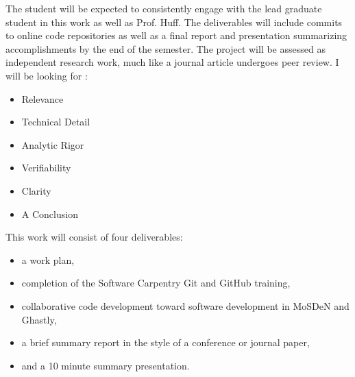 \documentclass[11pt, answers]{exam}
\begin{document}
The student will be expected to consistently engage with the lead graduate 
student in this work as well as Prof. Huff. The deliverables will include 
commits to online code repositories as well as a final report and presentation summarizing accomplishments by 
the end of the semester. The project will be assessed as independent research work, much 
like a journal article undergoes peer review. I will be looking for : 

\begin{itemize}
\item Relevance
\item Technical Detail 
\item Analytic Rigor
\item Verifiability
\item Clarity
\item A Conclusion
\end{itemize}

This work will consist of four deliverables:

\begin{itemize}
        \item a work plan,
        \item completion of the Software Carpentry Git and GitHub training,
        \item collaborative code development toward software development in 
                MoSDeN and Ghastly,
        \item a brief summary report in the style of a conference or journal paper,
        \item and a 10 minute summary presentation.
\end{itemize}
\end{document}
